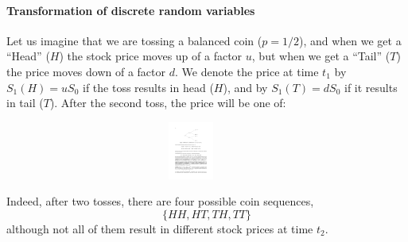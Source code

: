 \documentclass[notes=show,smaller,handout]{beamer}\usepackage[]{graphicx}\usepackage[]{color}
\begin{document}
\begin{frame}{\secname}
\framesubtitle{Transformation of discrete random variables}
\begin{example} 

Let us imagine that we are tossing a balanced coin ($p=1/2$), and when we get a ``Head'' ($H$) the stock price moves up of a factor $u$, but when we get a ``Tail'' ($T$) the price moves down of a factor $d$. We denote the price at time $t_1$  by $S_1(H)=u S_0 $ if the toss results in head ($H$), and by $S_1(T)=d S_0 $  if it results in tail ($T$). After the second toss, the price will be one of:
\begin{figure}[ptb]\centering
\includegraphics[height=0.75in, width=4in]{img/Shreve_Bin.pdf}%
\end{figure}%
Indeed, after two tosses, there are four possible coin sequences,
$$
\{HH,HT,TH,TT\}
$$
although not all of them result in different stock prices at time  $t_2$.
%
\end{example}
\end{frame}%
\end{document}
